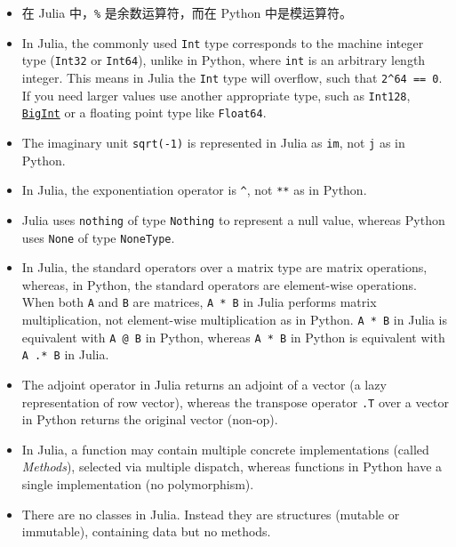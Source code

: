 \begin{itemize}
\item 在 Julia 中，\texttt{\%} 是余数运算符，而在 Python 中是模运算符。


\item In Julia, the commonly used \texttt{Int} type corresponds to the machine integer type (\texttt{Int32} or \texttt{Int64}), unlike in Python, where \texttt{int} is an arbitrary length integer. This means in Julia the \texttt{Int} type will overflow, such that \texttt{2{\textasciicircum}64 == 0}. If you need larger values use another appropriate type, such as \texttt{Int128}, \hyperlink{423405808990690832}{\texttt{BigInt}} or a floating point type like \texttt{Float64}.


\item The imaginary unit \texttt{sqrt(-1)} is represented in Julia as \texttt{im}, not \texttt{j} as in Python.


\item In Julia, the exponentiation operator is \texttt{{\textasciicircum}}, not \texttt{**} as in Python.


\item Julia uses \texttt{nothing} of type \texttt{Nothing} to represent a null value, whereas Python uses \texttt{None} of type \texttt{NoneType}.


\item In Julia, the standard operators over a matrix type are matrix operations, whereas, in Python, the standard operators are element-wise operations. When both \texttt{A} and \texttt{B} are matrices, \texttt{A * B} in Julia performs matrix multiplication, not element-wise multiplication as in Python. \texttt{A * B} in Julia is equivalent with \texttt{A @ B} in Python, whereas \texttt{A * B} in Python is equivalent with \texttt{A .* B} in Julia.


\item The adjoint operator \texttt{{\textquotesingle}} in Julia returns an adjoint of a vector (a lazy representation of row vector), whereas the transpose operator \texttt{.T} over a vector in Python returns the original vector (non-op).


\item In Julia, a function may contain multiple concrete implementations (called \emph{Methods}), selected via multiple dispatch, whereas functions in Python have a single implementation (no polymorphism).


\item There are no classes in Julia. Instead they are structures (mutable or immutable), containing data but no methods.



\end{itemize}
